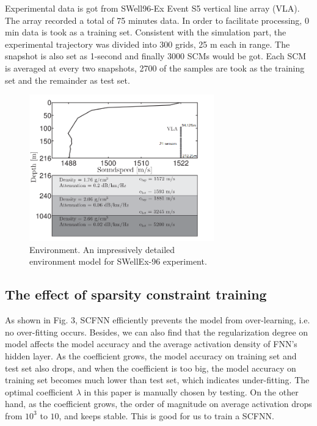 Experimental data is got from SWell96-Ex Event S5 vertical line array (VLA). The array recorded a total of 75 minutes data. In order to facilitate processing, 0 min data is took as a training set.
Consistent with the simulation part, the experimental trajectory was divided into 300 grids, 25 m each in range. The snapshot is also set as 1-second and finally 3000 SCMs would be got. Each SCM is averaged at every two snapshots, 2700 of the samples are took as the training set and the remainder as test set.
\begin{figure}
\includegraphics[width=8cm]{figure/environment}
\caption{Environment. An impressively detailed \\environment model for SWellEx-96 experiment.}
\end{figure}
\subsection{The effect of sparsity constraint training}
As shown in Fig. 3, SCFNN efficiently prevents the model from over-learning, i.e. no over-fitting occurs.
Besides, we can also find that the regularization degree on model affects the model accuracy and the average activation density of FNN's hidden layer. As the coefficient grows, the model accuracy on training set and test set also drops,
and when the coefficient is too big, the model accuracy on training set becomes much lower than test set, which indicates under-fitting.
The optimal coefficient $\lambda$ in this paper is manually chosen by testing.
On the other hand, as the coefficient grows, the order of magnitude on average activation drops from $10^{3}$ to $10$, and keeps stable. This is good for us to train a SCFNN.

